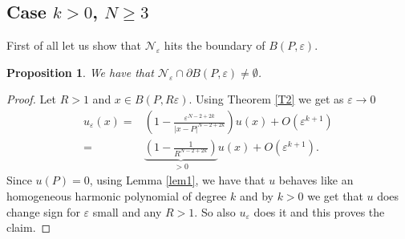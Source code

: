\documentclass[11pt,reqno]{article}
\newtheorem{prop}[teo]{Proposition}
\newtheorem{rem}[teo]{Remark}
\numberwithin{equation}{section}
\newcommand\R{\mathbb R}
\newcommand\e\varepsilon
\renewcommand\O\Omega
\newcommand{\Ma}{\color{blue}}
\newcommand{\Ying}{\color{red}}
\begin{document}

    
	\subsection{ Case $k>0$, $N\ge3$}
	\vskip0.2cm
	First of all let us show that $\mathcal{N_\e}$  hits the boundary of $B(P,\e)$.
	\begin{prop}\label{zon}
		We have that $\mathcal{N_\e}\cap \partial B(P,\e)\ne\emptyset$.
	\end{prop}
	\begin{proof}
Let $R>1$ and $x\in B(P,R\e)$. Using Theorem \ref{T2} we get as $\e\to0$
\begin{align}	
u_\e(x)=&\left(1-\frac{\e^{N-2+2k}}{|x-P|^{N-2+2k}}		\right)u(x)+O(\e^{k+1})\\=
&\underbrace{\left(1-\frac1{R^{N-2+2k}}		\right)}_{>0}u(x)+O(\e^{k+1}).
\end{align}
Since $u(P)=0$, using Lemma \ref{lem1}, we have that $u$ behaves like an homogeneous harmonic polynomial of degree $k$ and by $k>0$ we get that $u$ does change sign for $\e$ small and any $R>1$. So also $u_\e$ does it and this proves the claim.
	\end{proof}
\end{document}
